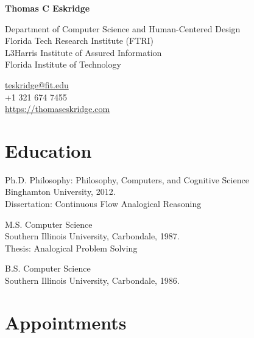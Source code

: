 \documentclass[12pt,letterpaper]{report}
\newcommand{\myname}{Thomas C Eskridge}
\newcommand{\namefont}[1]{{\normalfont\bfseries\Huge{#1}}}
\begin{document}
    \raggedright{}

    \namefont{\myname}

    \vspace{1em}
    \begin{minipage}[t]{0.700\textwidth}
        Department of Computer Science and Human-Centered Design \\
        Florida Tech Research Institute (FTRI) \\
        L3Harris Institute of Assured Information \\
        Florida Institute of Technology
    \end{minipage}
    \begin{minipage}[t]{0.295\textwidth}
        \flushright{}
        \href{mailto:teskridge@fit.edu}{teskridge@fit.edu} \\
        +1 321 674 7455 \\
        \href{https://thomaseskridge.com}{https://thomaseskridge.com}
    \end{minipage}


    \section*{Education}

    \begin{tablist}

        \item[Ph.D.] \tab{}Philosophy: Philosophy, Computers, and Cognitive Science \\Binghamton University, 2012. \\
                            Dissertation: Continuous Flow Analogical Reasoning
        \item[M.S.]  \tab{}Computer Science \\Southern Illinois University, Carbondale,  1987. \\
			 Thesis: Analogical Problem Solving
        \item[B.S.]  \tab{}Computer Science \\Southern Illinois University, Carbondale,  1986.


    \end{tablist}



    \section*{Appointments}
\end{document}
